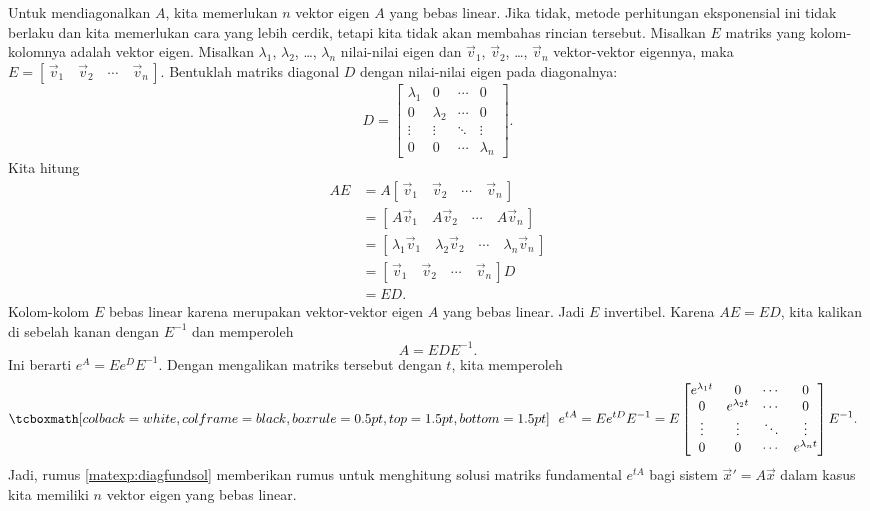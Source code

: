 Untuk mendiagonalkan $A$,
kita memerlukan $n$ vektor eigen $A$ yang bebas linear.
Jika tidak, metode perhitungan eksponensial ini tidak berlaku dan kita memerlukan cara yang lebih cerdik, tetapi kita
tidak akan membahas rincian tersebut.
Misalkan $E$ matriks yang kolom-kolomnya adalah vektor eigen.  
Misalkan $\lambda_1$, $\lambda_2$, \ldots, $\lambda_n$ nilai-nilai eigen dan
$\vec{v}_1$, $\vec{v}_2$, \ldots, $\vec{v}_n$ vektor-vektor eigennya, maka
$E = [\, \vec{v}_1 \quad \vec{v}_2 \quad \cdots \quad \vec{v}_n \,]$.
Bentuklah matriks diagonal $D$ dengan nilai-nilai eigen pada diagonalnya:
\begin{equation*}
D =
\begin{bmatrix}
\lambda_1 & 0 & \cdots & 0 \\
0 & \lambda_2 & \cdots & 0 \\
\vdots & \vdots & \ddots & \vdots \\
0 & 0 & \cdots & \lambda_n
\end{bmatrix} .
\end{equation*}
Kita hitung
\begin{equation*}
\begin{split}
AE & = A 
[\, \vec{v}_1 \quad \vec{v}_2 \quad \cdots \quad \vec{v}_n \,]
\\
& =
[\, A\vec{v}_1 \quad A\vec{v}_2 \quad \cdots \quad A\vec{v}_n \,]
\\
& =
[\, \lambda_1 \vec{v}_1 \quad \lambda_2 \vec{v}_2 \quad \cdots \quad
\lambda_n \vec{v}_n \,]
\\
& =
[\, \vec{v}_1 \quad \vec{v}_2 \quad \cdots \quad \vec{v}_n \,] D
\\
& =
ED .
\end{split}
\end{equation*}
Kolom-kolom $E$ bebas linear karena merupakan
vektor-vektor eigen $A$ yang
bebas linear.  Jadi $E$ invertibel.
Karena $AE = ED$, kita kalikan di sebelah kanan dengan $E^{-1}$ dan memperoleh
\begin{equation*}
A = E D E^{-1}.
\end{equation*}
Ini berarti $e^A = E e^D E^{-1}$.  Dengan mengalikan matriks tersebut dengan $t$, kita memperoleh
\begin{equation} \label{matexp:diagfundsol}
\mybxbg{~~
e^{tA} = 
Ee^{tD}E^{-1} = 
E
\begin{bmatrix}
e^{\lambda_1 t} & 0 & \cdots & 0 \\
0 & e^{\lambda_2 t} & \cdots & 0 \\
\vdots & \vdots & \ddots & \vdots \\
0 & 0 & \cdots & e^{\lambda_n t}
\end{bmatrix} 
E^{-1} .
~~}
\end{equation}
Jadi, rumus \eqref{matexp:diagfundsol} memberikan rumus
untuk menghitung solusi matriks fundamental $e^{tA}$ bagi
sistem ${\vec{x}}' = A \vec{x}$ dalam kasus kita memiliki
$n$ vektor eigen yang bebas linear.

